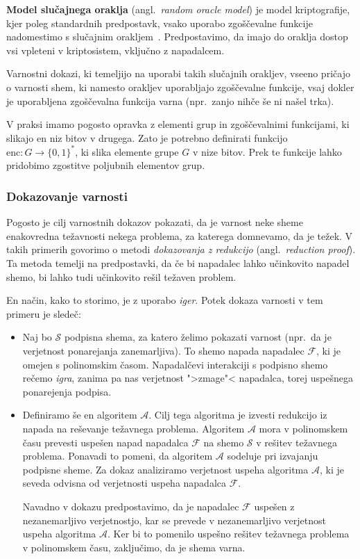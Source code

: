 \documentclass[isrm2, tisk]{fmfdelo}
\begin{document}
\textbf{Model slučajnega oraklja} (angl.\ \textit{random oracle model}) je model kriptografije, kjer poleg 
standardnih predpostavk, vsako uporabo zgoščevalne funkcije nadomestimo s slučajnim 
orakljem~\cite{boneh2023appcry}. Predpostavimo, da imajo do oraklja dostop vsi vpleteni v kriptosistem, 
vključno z napadalcem.

Varnostni dokazi, ki temeljijo na uporabi takih slučajnih orakljev, vseeno pričajo o varnosti shem,
ki namesto orakljev uporabljajo zgoščevalne funkcije, vsaj dokler je uporabljena zgoščevalna funkcija
varna (npr.\ zanjo nihče še ni našel trka).

\begin{opomba}
    V praksi imamo pogosto opravka z elementi grup in zgoščevalnimi funkcijami, ki slikajo en niz bitov
    v drugega. Zato je potrebno definirati funkcijo $\text{enc}: G \rightarrow \{0, 1\}^*$, ki slika
    elemente grupe $G$ v nize bitov. Prek te funkcije lahko pridobimo zgostitve poljubnih elementov grup.
\end{opomba}

\subsubsection{Dokazovanje varnosti}
Pogosto je cilj varnostnih dokazov pokazati, da je varnost neke sheme enakovredna težavnosti nekega
problema, za katerega domnevamo, da je težek. V takih primerih govorimo o metodi
\textit{dokazovanja z redukcijo} (angl.\ \textit{reduction proof}). Ta metoda temelji na predpostavki,
da če bi napadalec lahko učinkovito napadel shemo, bi lahko tudi učinkovito rešil težaven problem.

En način, kako to storimo, je z uporabo \textit{iger}. Potek dokaza varnosti v tem primeru je sledeč:
\begin{itemize}
    \item Naj bo $\mathcal{S}$ podpisna shema, za katero želimo pokazati varnost (npr.\ da je verjetnost
        ponarejanja zanemarljiva). To shemo napada napadalec $\mathcal{F}$, ki je omejen s
        polinomskim časom. Napadalčevi interakciji s podpisno shemo rečemo \textit{igra}, zanima
        pa nas verjetnost ">zmage"< napadalca, torej uspešnega ponarejenja podpisa.
    \item Definiramo še en algoritem $\mathcal{A}$. Cilj tega algoritma je izvesti redukcijo
        iz napada na reševanje težavnega problema. Algoritem $\mathcal{A}$ mora v polinomskem času
        prevesti uspešen napad napadalca $\mathcal{F}$ na shemo $\mathcal{S}$ v rešitev težavnega
        problema. Ponavadi to pomeni, da algoritem $\mathcal{A}$ sodeluje pri izvajanju podpisne sheme.
        Za dokaz analiziramo verjetnost uspeha algoritma $\mathcal{A}$, ki je seveda odvisna
        od verjetnosti uspeha napadalca $\mathcal{F}$.

        Navadno v dokazu predpostavimo, da je napadalec $\mathcal{F}$ uspešen z nezanemarljivo
        verjetnostjo, kar se prevede v nezanemarljivo verjetnost uspeha algoritma $\mathcal{A}$.
        Ker bi to pomenilo uspešno rešitev težavnega problema v polinomskem času, zaključimo, da je
        shema varna.
\end{itemize}
\end{document}
